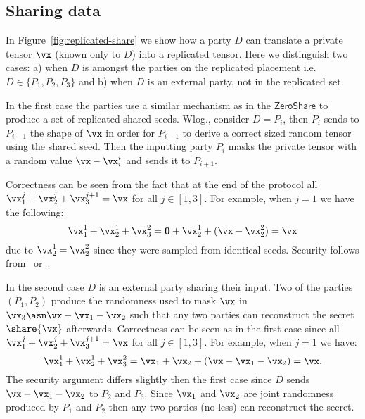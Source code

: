 \subsection{Sharing data}

In Figure~\ref{fig:replicated-share} we show how a party $D$ can translate a
private tensor $\vx$ (known only to $D$) into a replicated tensor.
Here we distinguish two cases: a) when $D$ is amongst the parties on the replicated placement
i.e. $D \in \{P_1, P_2, P_3\}$ and b) when $D$ is an external party, not in the replicated set.

In the first case the parties use a similar mechanism as in the
$\mathsf{ZeroShare}$ to produce a set of replicated shared seeds. Wlog., consider $D=P_i$,
then $P_i$ sends to $P_{i-1}$ the shape of $\vx$ in order for $P_{i-1}$ to derive a correct
sized random tensor using the shared seed. Then the inputting party
$P_i$ masks the private tensor with a random value $\vx - \vx_i^i$ and sends it
to $P_{i+1}$.

Correctness can be seen from the fact that at the end of the protocol all
$\vx_1^j + \vx_2^j + \vx_3^{j+1} = \vx$ for all $j \in [1,3]$. For example, when
$j = 1$ we have the following: $$\vx_1^1 + \vx_2^1 + \vx_3^2 = \mathbf{0} +
\vx_2^1 + (\vx - \vx_2^2) = \vx $$ due to $\vx_2^1 = \vx_2^2$ since they were
sampled from identical seeds. Security follows from~\cite{CCS:ABFLNO16}
or~\cite{CCS:MohRin18}.


In the second case $D$ is an external party sharing their input. Two of the
parties $(P_1, P_2)$ produce the randomness used to mask $\vx$ in $\vx_3 \asn
\vx - \vx_1 - \vx_2$ such that any two parties can reconstruct the secret
$\share{\vx}$ afterwards. Correctness can be seen as in the first case since all
$\vx_1^j + \vx_2^j + \vx_3^{j+1} = \vx$ for all $j \in [1,3]$. For example, when
$j = 1$ we have: $$ \vx_1^1 + \vx_2^1 + \vx_3^2 = \vx_1 + \vx_2 + (\vx - \vx_1 -
\vx_2) = \vx.$$ The security argument differs slightly then the first case since
$D$ sends $\vx - \vx_1 - \vx_2$ to $P_2$ and $P_3$. Since $\vx_1$ and $\vx_2$ are joint
randomness produced by $P_1$ and $P_2$ then any two parties (no less) can reconstruct the
secret.


